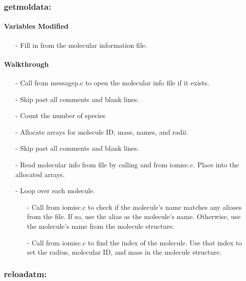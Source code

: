 \documentclass[letterpaper,12pt]{article}
\begin{document}
\subsubsection{getmoldata:}
\paragraph{Variables Modified}
\begin{enumerate}[leftmargin=10pt, noitemsep, parsep=0pt, topsep=0ex]
\item[-] Fill in  from the molecular information file.
\end{enumerate}

\paragraph{Walkthrough}
\begin{enumerate}[leftmargin=10pt, noitemsep, parsep=0pt, topsep=0ex]
\item[-] Call  from messagep.c to open the molecular info file if it exists.
\item[-] Skip past all comments and blank lines.
\item[-] Count the number of species
\item[-] Allocate arrays for molecule ID, mass, names, and radii.
\item[-] Skip past all comments and blank lines.
\item[-] Read molecular info from file by calling  and  from iomisc.c. Place into the allocated arrays.
\item[-] Loop over each molecule.
\begin{enumerate}[leftmargin=10pt, noitemsep, parsep=0pt, topsep=0ex]
\item[-] Call  from iomisc.c to check if the molecule's name matches any aliases from the file. If so, use the alias as the molecule's name. Otherwise, use the molecule's name from the molecule structure.
\item[-] Call  from iomisc.c to find the index of the molecule. Use that index to set the radius, molecular ID, and mass in the molecule structure. 
\end{enumerate}
\end{enumerate} 

\subsubsection{reloadatm:}
\end{document}
